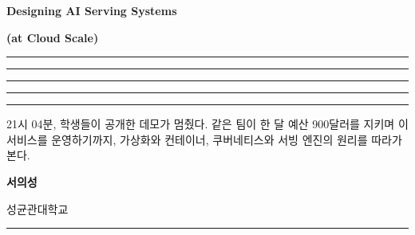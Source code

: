 \thispagestyle{empty}
\begingroup
\setlength{\parskip}{0pt}\raggedright

\par
\vspace{3pt}{\color{tbbtableborder}\rule{\linewidth}{0.4pt}}\par

\vspace{2.6cm}

{\titlefont\bfseries\fontsize{36}{40}\selectfont\color{tbbink}Designing AI Serving Systems\par}
\vspace{6pt}
{\titlefont\bfseries\fontsize{28}{32}\selectfont\color{tbbblue}(at Cloud Scale)\par}

\vspace{16pt}
\noindent\textcolor{tbbblue}{\rule{0.2\linewidth}{10pt}}%
\textcolor{tbbteal}{\rule{0.2\linewidth}{10pt}}%
\textcolor{tbbamber}{\rule{0.2\linewidth}{10pt}}%
\textcolor{tbbpurple}{\rule{0.2\linewidth}{10pt}}%
\textcolor{tbbred}{\rule{0.2\linewidth}{10pt}}\par

\vspace{18pt}
{\fontsize{15}{21}\selectfont\color{tbbgray}%
21시 04분, 학생들이 공개한 데모가 멈췄다. 같은 팀이 한 달 예산 900달러를 지키며 이 서비스를 운영하기까지, 가상화와 컨테이너, 쿠버네티스와 서빙 엔진의 원리를 따라가 본다.\par}

\vfill

{\bfseries\fontsize{24}{28}\selectfont\color{tbbink}서의성\par}
\vspace{4pt}
{\fontsize{14}{18}\selectfont\color{tbbgray}성균관대학교\par}

\vspace{1.4cm}
{\color{tbbtableborder}\rule{\linewidth}{0.4pt}}\par\vspace{6pt}
\endgroup
\clearpage
